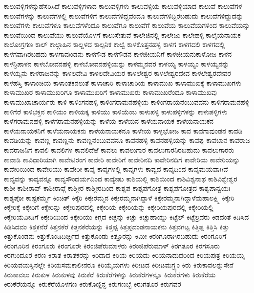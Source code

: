 {ಕಾಲುವಳ್ಳಿಗಳನ್ನುಹೆಸರಿಸಿದೆ
ಕಾಲುವಳ್ಳಿಗಳಾದ
ಕಾಲುವಳ್ಳಿಗಳು
ಕಾಲುವಳ್ಳಿಯ
ಕಾಲುವಳ್ಳಿಯಾದ
ಕಾಲುವೆ
ಕಾಲುವೆಗಳ
ಕಾಲುವೆಗಳನ್ನು
ಕಾಲುವೆಗಳಲ್ಲಿ
ಕಾಲುವೆಗಳಿಗೆ
ಕಾಲುವೆಗಳಿದ್ದವೆಂದೂ
ಕಾಲುವೆಗಳಿದ್ದಿರಬಹುದು
ಕಾಲುವೆಗಳಿದ್ದುದನ್ನು
ಕಾಲುವೆಗಳು
ಕಾಲುವೆಗಳೂ
ಕಾಲುವೆಗಳೆಂದೂ
ಕಾಲುವೆಗೂ
ಕಾಲುವೆಗೆ
ಕಾಲುವೆಯ
ಕಾಲುವೆಯಗಳಿಂದ
ಕಾಲುವೆಯನ್ನು
ಕಾಲುವೆಯಿಂದ
ಕಾಲುವೆಯು
ಕಾಲುವೆಯೊಳಗೆ
ಕಾಲುಸೇತುವೆ
ಕಾಲೇಜಿನಲ್ಲಿ
ಕಾಲೇಜು
ಕಾಲೇಹಳ್ಳಿ
ಕಾಲೈಯನಾಯಕ
ಕಾಲೋಗ್ರಗಣ
ಕಾಲ್
ಕಾಲ್ಗಾಹಿನ
ಕಾಲ್ದಳದ
ಕಾಲ್ಪನಿಕ
ಕಾಲ್ವೆ
ಕಾಳಕೊತ್ತನಹಳ್ಳಿ
ಕಾಳಗ
ಕಾಳಗದಲಿ
ಕಾಳಗದಲ್ಲಿ
ಕಾಳಗವಾಗಿರಬಹದು
ಕಾಳಗಾವುಂಡನು
ಕಾಳಗೌಡ
ಕಾಳಗೌಡನ
ಕಾಳಜೀಯನಿಗೆ
ಕಾಳಜೀಯನುಕಾಳೋಜ
ಕಾಳನ
ಕಾಳನ್ರಿಪಾಳನ
ಕಾಳಬೋವನಹಳ್ಳಿ
ಕಾಳಬೋವನಹಳ್ಳಿಯನ್ನು
ಕಾಳಮ್ಮನವರ
ಕಾಳಯ್ಯ
ಕಾಳಯ್ಯಂ
ಕಾಳಯ್ಯನನ್ನು
ಕಾಳಯ್ಯನು
ಕಾಳರಾಜನನ್ನು
ಕಾಳಲದೇವಿ
ಕಾಳಲದೇವಿಯರ
ಕಾಳಲೇಶ್ವರ
ಕಾಳಲೇಶ್ವರದೇವ
ಕಾಳಲೇಶ್ವರದೇವರ
ಕಾಳಹಸ್ತಿ
ಕಾಳಾಂಚಿಯ
ಕಾಳಾಂತಕನಲುತೆ
ಕಾಳಾಚಾರಿ
ಕಾಳಾಚಾರಿಯ
ಕಾಳಾಮುಖ
ಕಾಳಾಮುಖಕ್ಕೆ
ಕಾಳಾಮುಖಗಳು
ಕಾಳಾಮುಖರ
ಕಾಳಾಮುಖರಿಗೂ
ಕಾಳಾಮುಖರಿಗೆ
ಕಾಳಾಮುಖರು
ಕಾಳಾಮುಖರೆಂದೂ
ಕಾಳಾಮುಖವು
ಕಾಳಾಮುಖಾಚಾರ್ಯರು
ಕಾಳಿ
ಕಾಳಿಂಗನಹಳ್ಳಿ
ಕಾಳಿಂಗರಾಮನಹಳ್ಳಿಯ
ಕಾಳಿಂಗರಾಯನೆಂಬುವವನು
ಕಾಳಿಗರಾಮನಹಳ್ಳಿ
ಕಾಳಿಗೆರೆ
ಕಾಳಿಭಕ್ತನ
ಕಾಳಿಯಂ
ಕಾಳಿಯಕ್ಕ
ಕಾಳಿಯು
ಕಾಳಿಯೆಂಬ
ಕಾಳುಪಳ್ಳಿ
ಕಾಳುಪಳ್ಳಿಗಳನ್ನು
ಕಾಳುಪಳ್ಳಿಗಳು
ಕಾಳೆಗರಾಮನಹಳ್ಳಿ
ಕಾಳೆಗರಾಮನಹಳ್ಳಿಯನ್ನು
ಕಾಳೆಯ
ಕಾಳೆಯನ
ಕಾಳೆಯನಾಯಕ
ಕಾಳೆಯನಾಯಕನ
ಕಾಳೆಯನಾಯಕನಿಗೆ
ಕಾಳೆಯನಾಯಕನು
ಕಾಳೆಯನಾಯಕನೂ
ಕಾಳೇಯ
ಕಾಳ್ಳಭೋಜ
ಕಾವ
ಕಾವಗಾವುಂಡನ
ಕಾವಡಿ
ಕಾವಡಿಯನ್ನು
ಕಾವಣ್ಣ
ಕಾವಣ್ಣನು
ಕಾವಣ್ಣನೆಂಬುವವನೂ
ಕಾವನಹಳ್ಳಿ
ಕಾವನಹಳ್ಳಿಯನ್ನು
ಕಾವಪ್ಪ
ಕಾವಬಾನ
ಕಾವರಾಜ
ಕಾವರಾಜನಿಗೆ
ಕಾವಲಿ
ಕಾವಲಿಗಳ
ಕಾವಲಿದೆಱೆ
ಕಾವಲು
ಕಾವಲುಗಾರ
ಕಾವಲುಗಾರನಿರಬಹುದು
ಕಾವಲುಗಾರರು
ಕಾವಾಡಿ
ಕಾವಿಧಾರಿಯಾಗಿ
ಕಾವೇಟಿರಂಗ
ಕಾವೇರಿ
ಕಾವೇರಿಗೆ
ಕಾವೇರಿನದಿ
ಕಾವೇರಿನದಿಗೆ
ಕಾವೇರಿಯ
ಕಾವೇರಿಯನ್ನು
ಕಾವೇರಿಯಿಂದ
ಕಾವೇರಿಯು
ಕಾವೇರೀ
ಕಾವ್ಯ
ಕಾವ್ಯಗಳಲ್ಲಿ
ಕಾವ್ಯಗಳು
ಕಾವ್ಯದ
ಕಾವ್ಯದಿಂದ
ಕಾವ್ಯಮಯವಾಗಿವೆ
ಕಾವ್ಯವನ್ನು
ಕಾವ್ಯವನ್ನೂ
ಕಾವ್ಯಸೌಂದರ್ಯದಿಂದ
ಕಾವ್ಯೇಷು
ಕಾಶಿಯಲ್ಲಿ
ಕಾಶಿಯಿಂದ
ಕಾಶಿವಿಶ್ವನಾಥ
ಕಾಶಿವಿಶ್ವೇಶ್ವರ
ಕಾಶೀ
ಕಾಶೀರಾವ್
ಕಾಶೀರಾವ್ಗೆ
ಕಾಶ್ಮೀರ
ಕಾಶ್ಮೀರದಿಂದ
ಕಾಶ್ಯಪ
ಕಾಶ್ಯಪಗೋತ್ರ
ಕಾಶ್ಯಪಗೋತ್ರದ
ಕಾಶ್ಯಪಾನ್ವಯಃ
ಕಾಶ್ಯಪೋ
ಕಾಷ್ಟಕರ್ಮ್ಮ
ಕಿಂಚಿತ್
ಕಿಕ್ಕೆರಿ
ಕಿಕ್ಕೇರಮ್ಮನ
ಕಿಕ್ಕೇರಮ್ಮನಾಗಿದ್ದಾಳೆ
ಕಿಕ್ಕೇರಮ್ಮನಾಗಿದ್ದಾಳೆಮಹಾಲಕ್ಷ್ಮಿ
ಕಿಕ್ಕೇರಿ
ಕಿಕ್ಕೇರಿಕ್ಕೆ
ಕಿಕ್ಕೇರಿಗೆ
ಕಿಕ್ಕೇರಿನ್ನು
ಕಿಕ್ಕೇರಿಪುರದಲ್ಲಿ
ಕಿಕ್ಕೇರಿಯ
ಕಿಕ್ಕೇರಿಯನ್ನು
ಕಿಕ್ಕೇರಿಯಪುರದಲ್ಲಿ
ಕಿಕ್ಕೇರಿಯಲ್ಲಿ
ಕಿಕ್ಕೇರಿಯವೀಡಿಗೆ
ಕಿಕ್ಕೇರಿಯಿಂದ
ಕಿಕ್ಕೇರಿಯು
ಕಿಗ್ಗದ
ಕಿಚ್ಚನ್ನು
ಕಿಚ್ಚು
ಕಿಚ್ಚುಹಾಯ್ದು
ಕಿಟ್ಟೆಲ್
ಕಿಟ್ಟೆಲ್ರವರು
ಕಿಡದಂತೆ
ಕಿಡಿಸಿದ
ಕಿಡಿಸಿದವಂ
ಕಿತ್ತಕನೆರೆ
ಕಿತ್ತನಕೆರೆ
ಕಿತ್ತನಕೆರೆಯನ್ನು
ಕಿತ್ತಪ್ಪ
ಕಿತ್ತಪ್ಪದಂಡನಾಯಕನು
ಕಿತ್ತವಗಟ್ಟ
ಕಿತ್ತಿಪ್ಪ
ಕಿತ್ತಿಸಿ
ಕಿತ್ತು
ಕಿತ್ತುಕೊಂಡನು
ಕಿತ್ತುಕೊಂಡಿದಿರ್ಚ್ಚಿದ
ಕಿತ್ತುಕೊಂಡು
ಕಿತ್ತೂರನ್ನು
ಕಿಮೀ
ಕಿರಂಗೂರಾಗಿರಬಹುದು
ಕಿರಂಗೂರಿಗೆ
ಕಿರಂಗೂರಿನ
ಕಿರಂಗೂರು
ಕಿರಂಗೂರೇ
ಕಿರಂಜಿಪೆರುಮಾಳರು
ಕಿರಂಜಿಪೆರುಮಾಳ್
ಕಿರಗತೂರ
ಕಿರಗಸೂರು
ಕಿರಗುಂದೂರ
ಕಿರಣ
ಕಿರಾತ
ಕಿರಾತಕರನ್ನು
ಕಿರಿದಾದ
ಕಿರಿಯ
ಕಿರಿಯದು
ಕಿರಿಯನಾದುದರಿಂದ
ಕಿರಿಯಪುತ್ರ
ಕಿರಿಯಯ್ಯ
ಕಿರಿಯವಯಸ್ಸಿನಲ್ಲೇ
ಕಿರಿಯಸಮಕಾಲೀನರೂ
ಕಿರಿಯೈಯಗಳು
ಕಿರೀಟದ
ಕಿರೀಟಮಗ್ರ್ಯಂ
ಕಿರು
ಕಿರುಕಾವಲನ್ನುಸೇನೆ
ಕಿರುಕಾವಲು
ಕಿರುಕುಳ
ಕಿರುಕುಳವು
ಕಿರುಕೆರೆ
ಕಿರುಕೆರೆಗಳನ್ನು
ಕಿರುಕೆರೆಗಳನ್ನೂ
ಕಿರುಕೆರೆಗಳು
ಕಿರುಕೆರೆಯ
ಕಿರುಕೆರೆಯನ್ನೂ
ಕಿರುಕೆರೆಯೊಳಗಣ
ಕಿರುಕೊಣ್ಣಿನ್ದ
ಕಿರುಗಣಬ್ಬೆ
ಕಿರುಗತೂರ
ಕಿರುಗವರ
}

